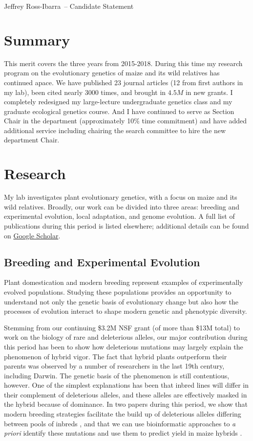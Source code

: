 \documentclass[letterpaper,10pt]{article}
\def\name{Jeffrey Ross-Ibarra}
\begin{document}
{\huge \name\ -- Candidate Statement}

\vspace{0.25in}

\section*{Summary}

This merit covers the three years from 2015-2018. During this time my research program on the evolutionary genetics of maize and its wild relatives has continued apace.
We have published 23 journal articles (12 from first authors in my lab), been cited nearly 3000 times, and brought in $4.5M$ in new grants.
I completely redesigned my large-lecture undergraduate genetics class and my graduate ecological genetics course.
And I have continued to serve as Section Chair in the department (approximately 10\% time commitment) and have added additional service including chairing the search committee to hire the new department Chair.

\section*{Research}

My lab investigates plant evolutionary genetics, with a focus on maize and its wild relatives.
Broadly, our work can be divided into three areas: breeding and experimental evolution, local adaptation, and genome evolution.
A full list of publications during this period is listed elsewhere; additional details can be found on \href{https://scholar.google.com/citations?user=5SzRq1oAAAAJ&hl=en&authuser=1}{Google Scholar}.

\subsection*{Breeding and Experimental Evolution}
Plant domestication and modern breeding represent examples of experimentally evolved populations.
Studying these populations provides an opportunity to understand not only the genetic basis of evolutionary change but also how the processes of evolution interact to shape modern genetic and phenotypic diversity.

Stemming from our continuing \$3.2M NSF grant (of more than \$13M total) to work on the biology of rare and deleterious alleles, our major contribution during this period has been to show how deleterious mutations may largely explain the phenomenon of hybrid vigor.
The fact that hybrid plants outperform their parents was observed by a number of researchers in the last 19th century, including Darwin.
The genetic basis of the phenomenon is still contentious, however.
One of the simplest explanations has been that inbred lines will differ in their complement of deleterious alleles, and these alleles are effectively masked in the hybrid because of dominance.
In two papers during this period, we show that modern breeding strategies facilitate the build up of deleterious alleles differing between pools of inbreds \cite{gerke2015genomic}, and that we can use bioinformatic approaches to \textit{a priori} identify these mutations and use them to predict yield in maize hybrids \cite{yang2017incomplete}.
\end{document}
